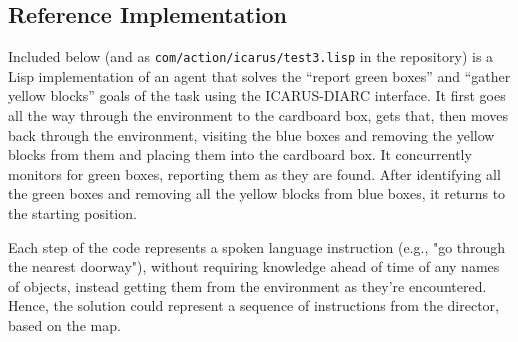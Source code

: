 \documentclass{article}
\begin{document}
\subsection*{Reference Implementation}

Included below (and as {\tt com/action/icarus/test3.lisp} in the 
repository) is a Lisp implementation of an agent that solves the 
``report green boxes'' and ``gather yellow blocks'' goals of the task 
using the ICARUS-DIARC interface.  It first goes all the way through 
the environment to the cardboard box, gets that, then moves back 
through the environment, visiting the blue boxes and removing the 
yellow blocks from them and placing them into the cardboard box.  It 
concurrently monitors for green boxes, reporting them as they are 
found.  After identifying all the green boxes and removing all the 
yellow blocks from blue boxes, it returns to the starting position.

Each step of the code represents a spoken language instruction (e.g., 
"go through the nearest doorway"), without requiring  knowledge ahead 
of time of any names of objects, instead getting them from the 
environment as they're encountered.  Hence, the solution could 
represent a sequence of instructions from the director, based on the 
map.
\end{document}
